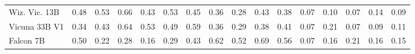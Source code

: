 \begin{table}[!htbp]
\begin{tabular}{l|rrrr|r|rrrr|r|rrrr|r}
Wiz. Vic. 13B & {\cellcolor[HTML]{A7DB8C}} \color[HTML]{000000} 0.48 & {\cellcolor[HTML]{8ED082}} \color[HTML]{000000} 0.53 & {\cellcolor[HTML]{4FB264}} \color[HTML]{F1F1F1} 0.66 & {\cellcolor[HTML]{BEE596}} \color[HTML]{000000} 0.43 & {\cellcolor[HTML]{92D183}} \color[HTML]{000000} 0.53 & {\cellcolor[HTML]{F74327}} \color[HTML]{F1F1F1} 0.45 & {\cellcolor[HTML]{FD8038}} \color[HTML]{F1F1F1} 0.36 & {\cellcolor[HTML]{FEAB49}} \color[HTML]{000000} 0.28 & {\cellcolor[HTML]{FC4F2A}} \color[HTML]{F1F1F1} 0.43 & {\cellcolor[HTML]{FD7435}} \color[HTML]{F1F1F1} 0.38 & {\cellcolor[HTML]{FECE65}} \color[HTML]{000000} 0.07 & {\cellcolor[HTML]{FE9829}} \color[HTML]{000000} 0.10 & {\cellcolor[HTML]{FECE65}} \color[HTML]{000000} 0.07 & {\cellcolor[HTML]{E1640E}} \color[HTML]{F1F1F1} 0.14 & {\cellcolor[HTML]{FEA736}} \color[HTML]{000000} 0.09 \\
Vicuna 33B V1 & {\cellcolor[HTML]{DFF3A8}} \color[HTML]{000000} 0.34 & {\cellcolor[HTML]{BEE596}} \color[HTML]{000000} 0.43 & {\cellcolor[HTML]{58B669}} \color[HTML]{F1F1F1} 0.64 & {\cellcolor[HTML]{8ED082}} \color[HTML]{000000} 0.53 & {\cellcolor[HTML]{A6DA8B}} \color[HTML]{000000} 0.49 & {\cellcolor[HTML]{C40524}} \color[HTML]{F1F1F1} 0.59 & {\cellcolor[HTML]{FD8038}} \color[HTML]{F1F1F1} 0.36 & {\cellcolor[HTML]{FEA446}} \color[HTML]{000000} 0.29 & {\cellcolor[HTML]{FD7435}} \color[HTML]{F1F1F1} 0.38 & {\cellcolor[HTML]{FC612F}} \color[HTML]{F1F1F1} 0.41 & {\cellcolor[HTML]{FECE65}} \color[HTML]{000000} 0.07 & {\cellcolor[HTML]{662506}} \color[HTML]{F1F1F1} 0.21 & {\cellcolor[HTML]{FECE65}} \color[HTML]{000000} 0.07 & {\cellcolor[HTML]{FEB643}} \color[HTML]{000000} 0.09 & {\cellcolor[HTML]{FB9225}} \color[HTML]{000000} 0.11 \\
Falcon 7B & {\cellcolor[HTML]{9FD788}} \color[HTML]{000000} 0.50 & {\cellcolor[HTML]{FAFDC9}} \color[HTML]{000000} 0.22 & {\cellcolor[HTML]{F3FAB6}} \color[HTML]{000000} 0.28 & {\cellcolor[HTML]{FFFFE5}} \color[HTML]{000000} 0.16 & {\cellcolor[HTML]{EFF9B3}} \color[HTML]{000000} 0.29 & {\cellcolor[HTML]{FC4F2A}} \color[HTML]{F1F1F1} 0.43 & {\cellcolor[HTML]{B00026}} \color[HTML]{F1F1F1} 0.62 & {\cellcolor[HTML]{E2191C}} \color[HTML]{F1F1F1} 0.52 & {\cellcolor[HTML]{800026}} \color[HTML]{F1F1F1} 0.69 & {\cellcolor[HTML]{CE0C22}} \color[HTML]{F1F1F1} 0.56 & {\cellcolor[HTML]{FECE65}} \color[HTML]{000000} 0.07 & {\cellcolor[HTML]{CB4B02}} \color[HTML]{F1F1F1} 0.16 & {\cellcolor[HTML]{662506}} \color[HTML]{F1F1F1} 0.21 & {\cellcolor[HTML]{CB4B02}} \color[HTML]{F1F1F1} 0.16 & {\cellcolor[HTML]{D65808}} \color[HTML]{F1F1F1} 0.15 \\
\bottomrule
\end{tabular}
\setlength{\tabcolsep}{6pt}
\end{table}